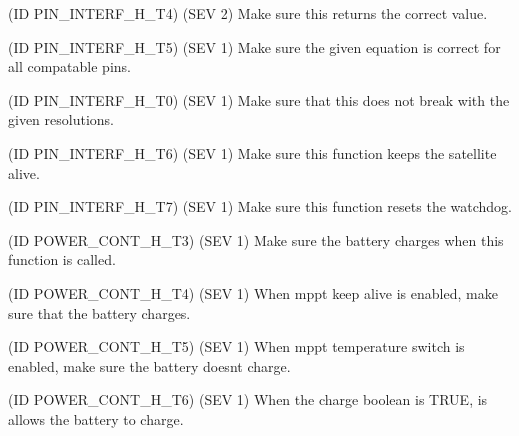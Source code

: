 \begin{DoxyRefList}
(ID P\+I\+N\+\_\+\+I\+N\+T\+E\+R\+F\+\_\+\+H\+\_\+\+T4) (S\+EV 2) Make sure this returns the correct value. 
\item[\label{test__test000036}%
\Hypertarget{test__test000036}%
Global \hyperlink{pin__interface_8h_a33980455d0d1f81544f71605e4acaba5}{Pin\+\_\+\+Interface\+\_\+\+Read\+\_\+\+Voltage} (uint8\+\_\+t pin)](ID P\+I\+N\+\_\+\+I\+N\+T\+E\+R\+F\+\_\+\+H\+\_\+\+T5) (S\+EV 1) Make sure the given equation is correct for all compatable pins. 
\item[\label{test__test000033}%
\Hypertarget{test__test000033}%
Global \hyperlink{pin__interface_8h_a5f7aaf72d73969a1623da04d35f6f98c}{Pin\+\_\+\+Interface\+\_\+\+Set\+\_\+\+Temp\+\_\+\+Resolution} (uint8\+\_\+t sensor\+Addr, uint8\+\_\+t res)](ID P\+I\+N\+\_\+\+I\+N\+T\+E\+R\+F\+\_\+\+H\+\_\+\+T0) (S\+EV 1) Make sure that this does not break with the given resolutions. 
\item[\label{test__test000037}%
\Hypertarget{test__test000037}%
Global \hyperlink{pin__interface_8h_a912aff671fe4db53ca23520a1d203d6f}{Pin\+\_\+\+Interface\+\_\+\+Watchdog\+\_\+\+Heartbeat} (bool manage\+Battery=false)](ID P\+I\+N\+\_\+\+I\+N\+T\+E\+R\+F\+\_\+\+H\+\_\+\+T6) (S\+EV 1) Make sure this function keeps the satellite alive. 
\item[\label{test__test000038}%
\Hypertarget{test__test000038}%
Global \hyperlink{pin__interface_8h_a016ad19733549152625049452a9c01ca}{Pin\+\_\+\+Interface\+\_\+\+Watchdog\+\_\+\+Restart} ()](ID P\+I\+N\+\_\+\+I\+N\+T\+E\+R\+F\+\_\+\+H\+\_\+\+T7) (S\+EV 1) Make sure this function resets the watchdog. 
\item[\label{test__test000041}%
\Hypertarget{test__test000041}%
Global \hyperlink{power__control_8h_a4e4e7a68a32a2d3fc0b7c0b14b391975}{Power\+\_\+\+Control\+\_\+\+Charge} (bool charge)](ID P\+O\+W\+E\+R\+\_\+\+C\+O\+N\+T\+\_\+\+H\+\_\+\+T3) (S\+EV 1) Make sure the battery charges when this function is called. 

(ID P\+O\+W\+E\+R\+\_\+\+C\+O\+N\+T\+\_\+\+H\+\_\+\+T4) (S\+EV 1) When mppt keep alive is enabled, make sure that the battery charges. 

(ID P\+O\+W\+E\+R\+\_\+\+C\+O\+N\+T\+\_\+\+H\+\_\+\+T5) (S\+EV 1) When mppt temperature switch is enabled, make sure the battery doesn\textquotesingle{}t charge. 

(ID P\+O\+W\+E\+R\+\_\+\+C\+O\+N\+T\+\_\+\+H\+\_\+\+T6) (S\+EV 1) When the charge boolean is T\+R\+UE, is allows the battery to charge. 


\end{DoxyRefList}
